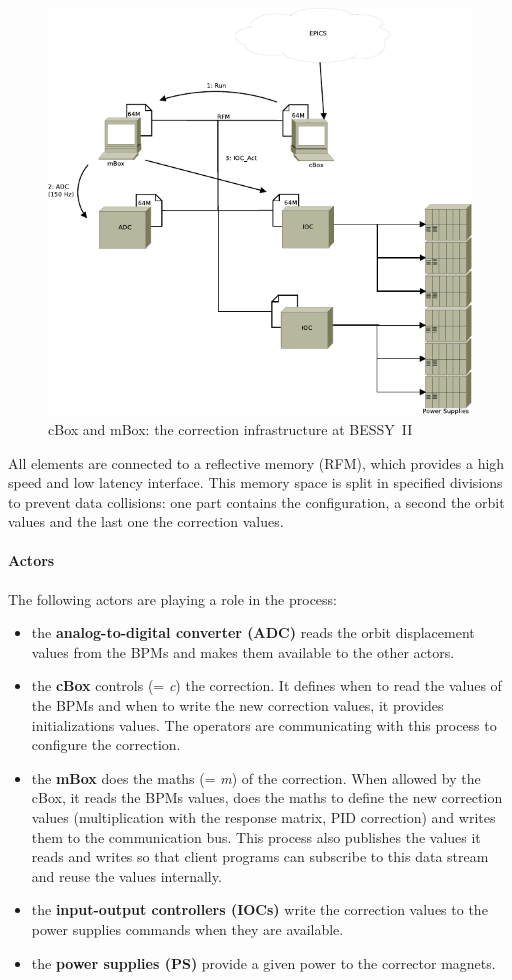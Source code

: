 \begin{figure}[!h]
    \centering
    \includegraphics[width=.85\linewidth]{img/mBox_cBox}
    \caption{\label{fig:cbox_mbox}cBox and mBox: the correction infrastructure at BESSY~II}
\end{figure}

All elements are connected to a reflective memory (RFM), which provides a high speed and low latency interface. This memory space is split in specified divisions to prevent data collisions: one part contains the configuration, a second the orbit values and the last one the correction values.

\paragraph{Actors}
The following actors are playing a role in the process:
\begin{itemize}
    \item the \textbf{analog-to-digital converter (ADC)} reads the orbit displacement values from the BPMs and makes them available to the other actors.
    \item the \textbf{cBox} controls (= \textit{c}) the correction. It defines when to read the values of the BPMs and when to write the new correction values, it provides initializations values. The operators are communicating with this process to configure the correction.
    \item the \textbf{mBox} does the maths (= \textit{m}) of the correction. When allowed by the cBox, it reads the BPMs values, does the maths to define the new correction values (multiplication with the response matrix, PID correction) and writes them to the communication bus. This process also publishes the values it reads and writes so that client programs can subscribe to this data stream and reuse the values internally.
    \item the \textbf{input-output controllers (IOCs)} write the correction values to the power supplies commands when they are available.
    \item the \textbf{power supplies (PS)} provide a given power to the corrector magnets.
\end{itemize}


